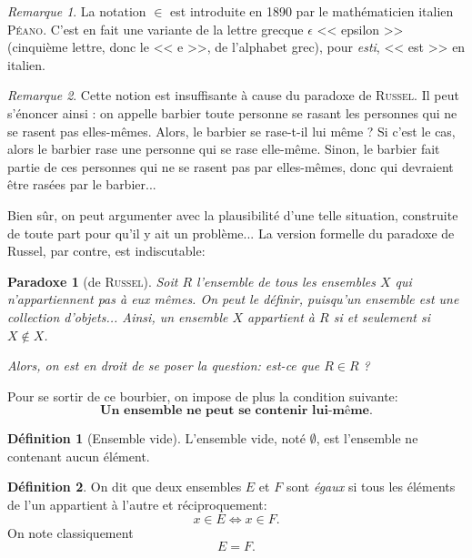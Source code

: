 \documentclass[11pt]{article}
\let\oldepsilon\epsilon
\renewcommand\epsilon\varepsilon
\theoremstyle{definition}
\newtheorem{defn}{Définition}[section]
\theoremstyle{remark}
\newtheorem{rem}{Remarque}
\begin{document}
\begin{rem}
La notation $\in$ est introduite en 1890 par le mathématicien italien \textsc{Péano}. C'est en fait une variante de la lettre grecque $\oldepsilon$ << epsilon >> (cinquième lettre, donc le << e >>, de l'alphabet grec), pour \textit{esti}, << est >> en italien.
\end{rem}

\begin{rem} Cette notion est insuffisante à cause du paradoxe de \textsc{Russel}. Il peut s'énoncer ainsi : on appelle barbier toute personne se rasant les personnes qui ne se rasent pas elles-mêmes. Alors, le barbier se rase-t-il lui même ? Si c'est le cas, alors le barbier rase une personne qui se rase elle-même. Sinon, le barbier fait partie de ces personnes qui ne se rasent pas par elles-mêmes, donc qui devraient être rasées par le barbier...
\end{rem}

Bien sûr, on peut argumenter avec la plausibilité d'une telle situation, construite de toute part pour qu'il y ait un problème... La version formelle du paradoxe de Russel, par contre, est indiscutable:

\theoremstyle{plain}
\newtheorem*{paradox}{Paradoxe}
\begin{paradox}[de \textsc{Russel}]
Soit $R$ l'ensemble de tous les ensembles $X$ qui n'appartiennent pas à eux mêmes. On peut le définir, puisqu'un ensemble est une collection d'objets... Ainsi, un ensemble $X$ appartient à $R$ si et seulement si $X\not\in X$.

Alors, on est en droit de se poser la question: est-ce que $R\in R$ ?
\end{paradox}

Pour se sortir de ce bourbier, on impose de plus la condition suivante:
\[\textbf{Un ensemble ne peut se contenir lui-même.}\]

\begin{defn}[Ensemble vide]
L'ensemble vide, noté $\emptyset$, est l'ensemble ne contenant aucun élément.
\end{defn}

\begin{defn}
On dit que deux ensembles $E$ et $F$ sont \textit{égaux} si tous les éléments de l'un appartient à l'autre et réciproquement:
\[
x\in E\Longleftrightarrow x\in F.
\]
On note classiquement
\[ E = F. \]
\end{defn}
\end{document}

